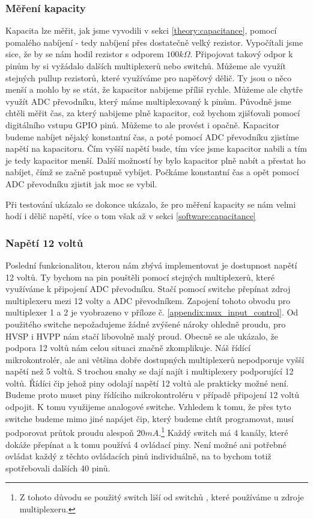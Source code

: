 \documentclass[11pt,a4paper,twoside,openright]{report}
\begin{document}
\subsubsection{Měření kapacity}

Kapacita lze měřit, jak jsme vyvodili v sekci \ref{theory:capacitance}, pomocí pomalého nabíjení - tedy nabíjení přes dostatečně velký rezistor. Vypočítali jsme sice, že by se nám hodil rezistor s odporem $100k\Omega$. Připojovat takový odpor k pinům by si vyžádalo dalších multiplexerů nebo switchů. Můžeme ale využít stejných pullup rezistorů, které využíváme pro napěťový dělič. Ty jsou o něco menší a mohlo by se stát, že kapacitor nabijeme příliš rychle. Můžeme ale chytře využít ADC převodníku, který máme multiplexovaný k pinům. Původně jsme chtěli měřit čas, za který nabijeme plně kapacitor, což bychom zjišťovali pomocí digitálního vstupu GPIO pinů. Můžeme to ale provést i opačně. Kapacitor budeme nabíjet nějaký konstantní čas, a poté pomocí ADC převodníku zjistíme napětí na kapacitoru. Čím vyšší napětí bude, tím více jsme kapacitor nabili a tím je tedy kapacitor menší. Další možností by bylo kapacitor plně nabít a přestat ho nabíjet, čímž se začně postupně vybíjet. Počkáme konstantní čas a opět pomocí ADC převodníku zjistit jak moc se vybil. 

Při testování ukázalo se dokonce ukázalo, že pro měření kapacity se nám velmi hodí i dělič napětí, více o tom však až v sekci \ref{software:capacitance}

\subsubsection {Napětí 12 voltů}

Poslední funkcionalitou, kterou nám zbývá implementovat je dostupnost napětí 12 voltů. Ty bychom na pin pouštěli pomocí stejných multiplexerů, které využíváme k připojení ADC převodníku. Stačí pomocí switche\cite{switch2} přepínat zdroj multiplexeru mezi 12 volty a ADC převodníkem. Zapojení tohoto obvodu pro multiplexer 1 a 2 je vyobrazeno v příloze č. \ref{appendix:mux_input_control}. Od použitého switche nepožadujeme žádné zvýšené nároky ohledně proudu, pro HVSP i HVPP nám stačí libovolně malý proud. Obecně se ale ukázalo, že podpora 12 voltů nám celou situaci značně zkomplikuje. Náš řídící mikrokontrolér, ale ani většina dobře dostupných multiplexerů nepodporuje vyšší napětí než 5 voltů. S trochou snahy se dají najít i multiplexery podporující 12 voltů. Řídíci čip jehož piny odolají napětí 12 voltů ale prakticky možné není. Budeme proto muset piny řídíciho mikrokontroléru v případě připojení 12 voltů odpojit. K tomu využijeme analogové switche\cite{switch1}. Vzhledem k tomu, že přes tyto switche budeme mimo jiné napájet čip, který budeme chtít programovat, musí podporovat průtok proudu alespoň $20mA$.\footnote{Z tohoto důvodu se použitý switch liší od switchů \cite{switch2}, které používáme u zdroje multiplexeru.} Každý switch má 4 kanály, které dokáže přepínat a k tomu používá 4 ovládací piny. Není možné ani potřebné ovládat každý z těchto ovládacích pinů individuálně, na to bychom totiž spotřebovali dalších 40 pinů.
\end{document}
